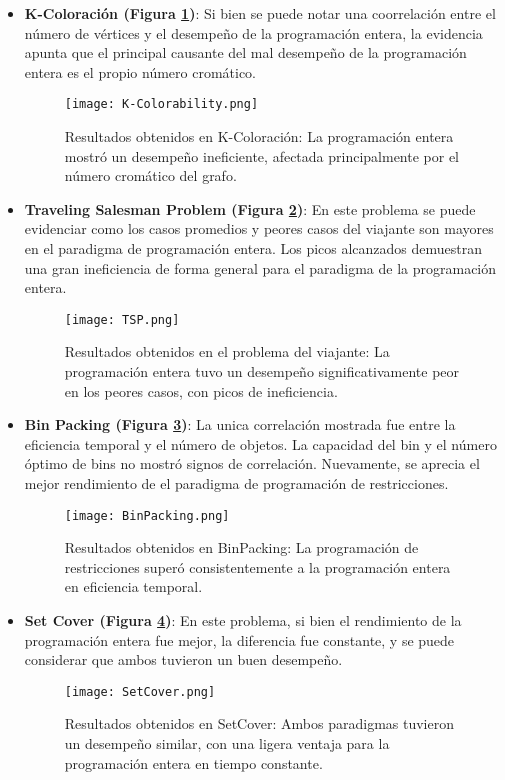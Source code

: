 \documentclass[12pt]{report}
\begin{document}
\begin{itemize}
    \item \textbf{K-Coloración (Figura \ref{fig:K-Colorability})}: Si bien se puede notar una coorrelación entre el número de vértices y el desempeño de la programación entera, la evidencia apunta que el principal causante del mal desempeño de la programación entera es el propio número cromático.
    \begin{figure}[ht]
    \centering
    \texttt{[image: K-Colorability.png]}
    \caption{Resultados obtenidos en K-Coloración: La programación entera mostró un desempeño ineficiente, afectada principalmente por el número cromático del grafo.}
    \label{fig:K-Colorability}
    \end{figure}

    
    \item \textbf{Traveling Salesman Problem (Figura \ref{fig:TSP})}: En este problema se puede evidenciar como los casos promedios y peores casos del viajante son mayores en el paradigma de programación entera. Los picos alcanzados demuestran una gran ineficiencia de forma general para el paradigma de la programación entera.
    \begin{figure}[ht]
    \centering
    \texttt{[image: TSP.png]}
    \caption{Resultados obtenidos en el problema del viajante: La programación entera tuvo un desempeño significativamente peor en los peores casos, con picos de ineficiencia.}
    \label{fig:TSP}
    \end{figure}


    \item \textbf{Bin Packing (Figura \ref{fig:BinPacking})}: La unica correlación mostrada fue entre la eficiencia temporal y el número de objetos. La capacidad del bin y el número óptimo de bins no mostró signos de correlación. Nuevamente, se aprecia el mejor rendimiento de el paradigma de programación de restricciones. 
    \begin{figure}[ht]
    \centering
    \texttt{[image: BinPacking.png]}
    \caption{Resultados obtenidos en BinPacking: La programación de restricciones superó consistentemente a la programación entera en eficiencia temporal.}
    \label{fig:BinPacking}
    \end{figure}


    \item \textbf{Set Cover (Figura \ref{fig:SetCover})}: En este problema, si bien el rendimiento de la programación entera fue mejor, la diferencia fue constante, y se puede considerar que ambos tuvieron un buen desempeño.
    \begin{figure}[ht]
    \centering
    \texttt{[image: SetCover.png]}
    \caption{Resultados obtenidos en SetCover: Ambos paradigmas tuvieron un desempeño similar, con una ligera ventaja para la programación entera en tiempo constante.}
    \label{fig:SetCover}
    \end{figure}



\end{itemize}
\end{document}
